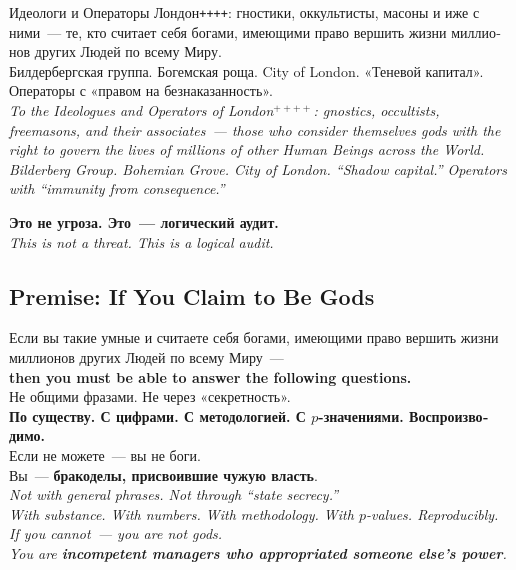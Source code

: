 \documentclass[11pt,a4paper]{article}
\theoremstyle{definition}
\theoremstyle{remark}
\begin{document}
\begin{londonbox}
\foreignlanguage{russian}{
Идеологи и Операторы Лондон\texttt{++++}:
гностики, оккультисты, масоны и иже с ними~---
те, кто считает себя богами, имеющими право вершить жизни
миллионов других Людей по всему Миру.\\[0.2cm]
Билдербергская группа. Богемская роща. City of London.
«Теневой капитал». Операторы с «правом на безнаказанность».\\[0.2cm]
}
\textit{To the Ideologues and Operators of London$^{++++}$:
gnostics, occultists, freemasons, and their associates~---
those who consider themselves gods with the right to govern
the lives of millions of other Human Beings across the World.\\[0.2cm]
Bilderberg Group. Bohemian Grove. City of London.
``Shadow capital.'' Operators with ``immunity from consequence.''}
\end{londonbox}

\vspace{0.4cm}

\begin{center}
{\large\color{accentcolor}
\foreignlanguage{russian}{
\textbf{Это не угроза. Это~--- логический аудит.}\\
\textit{This is not a threat. This is a logical audit.}
}}
\end{center}

\vspace{0.4cm}

\subsection{Premise: If You Claim to Be Gods}
\label{sec:london-premise}

\begin{manifestobox}
\foreignlanguage{russian}{
Если вы такие умные и считаете себя богами,
имеющими право вершить жизни миллионов других Людей
по всему Миру~---\\[0.3cm]
}
\textbf{then you must be able to answer the following questions.}\\[0.2cm]
\foreignlanguage{russian}{
Не общими фразами. Не через «секретность».\\
\textbf{По существу. С цифрами. С методологией.
С $p$-значениями. Воспроизводимо.}\\[0.2cm]
Если не можете~--- вы не боги.\\
Вы~--- \textbf{бракоделы, присвоившие чужую власть}.
}\\[0.2cm]
\textit{Not with general phrases. Not through ``state secrecy.''\\
With substance. With numbers. With methodology.
With $p$-values. Reproducibly.\\[0.2cm]
If you cannot~--- you are not gods.\\
You are \textbf{incompetent managers who appropriated someone else's power}.}
\end{manifestobox}
\end{document}
